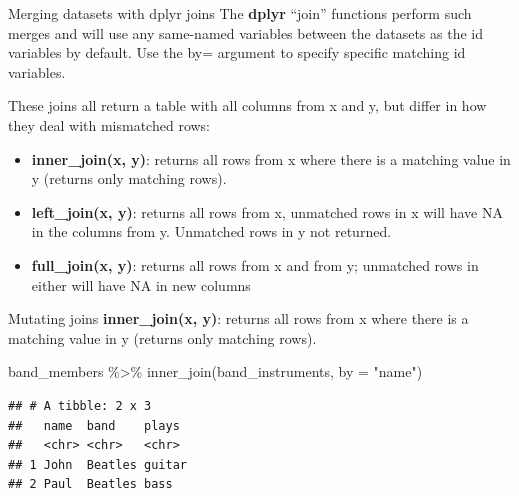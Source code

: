 \documentclass[
  ignorenonframetext,
]{beamer}
\newenvironment{Shaded}{\begin{snugshade}}{\end{snugshade}}
\newcommand{\AttributeTok}[1]{\textcolor[rgb]{0.77,0.63,0.00}{#1}}
\newcommand{\FunctionTok}[1]{\textcolor[rgb]{0.00,0.00,0.00}{#1}}
\newcommand{\NormalTok}[1]{#1}
\newcommand{\SpecialCharTok}[1]{\textcolor[rgb]{0.00,0.00,0.00}{#1}}
\newcommand{\StringTok}[1]{\textcolor[rgb]{0.31,0.60,0.02}{#1}}
\begin{document}
\begin{frame}{Merging datasets with dplyr joins}
\protect\hypertarget{merging-datasets-with-dplyr-joins}{}
The \textbf{dplyr} ``join'' functions perform such merges and will use
any same-named variables between the datasets as the id variables by
default. Use the by= argument to specify specific matching id variables.

These joins all return a table with all columns from x and y, but differ
in how they deal with mismatched rows:

\begin{itemize}
\item
  \textbf{inner\_join(x, y)}: returns all rows from x where there is a
  matching value in y (returns only matching rows).
\item
  \textbf{left\_join(x, y)}: returns all rows from x, unmatched rows in
  x will have NA in the columns from y. Unmatched rows in y not
  returned.
\item
  \textbf{full\_join(x, y)}: returns all rows from x and from y;
  unmatched rows in either will have NA in new columns
\end{itemize}
\end{frame}

\begin{frame}[fragile]{Mutating joins}
\protect\hypertarget{mutating-joins}{}
\textbf{inner\_join(x, y)}: returns all rows from x where there is a
matching value in y (returns only matching rows).

\footnotesize

\begin{Shaded}
\begin{Highlighting}[]
\NormalTok{band\_members }\SpecialCharTok{\%\textgreater{}\%} 
    \FunctionTok{inner\_join}\NormalTok{(band\_instruments, }\AttributeTok{by =} \StringTok{"name"}\NormalTok{)}
\end{Highlighting}
\end{Shaded}

\begin{verbatim}
## # A tibble: 2 x 3
##   name  band    plays 
##   <chr> <chr>   <chr> 
## 1 John  Beatles guitar
## 2 Paul  Beatles bass
\end{verbatim}

\normalsize
\end{frame}
\end{document}
